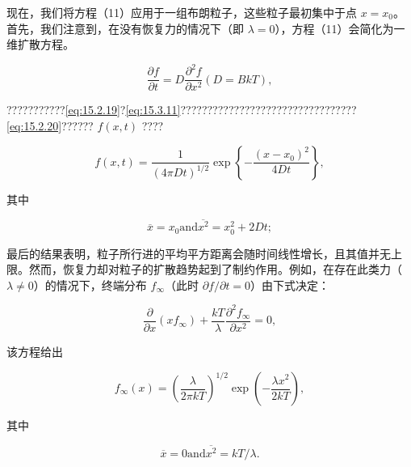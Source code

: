 现在，我们将方程（11）应用于一组布朗粒子，这些粒子最初集中于点 \(x = x_0\)。首先，我们注意到，在没有恢复力的情况下（即 \(\lambda = 0\)），方程（11）会简化为一维扩散方程。

\begin{equation}\tag{15.4.12}\label{eq:15.4.12}
\frac { \partial f } { \partial t } = D \frac { \partial ^{2} f } { \partial x ^{2} }  ( D = B k T ) ,
\end{equation}

???????????\autoref{eq:15.2.19}?\autoref{eq:15.3.11}?????????????????????????????????\autoref{eq:15.2.20}?????? \(f(x,t)\) ????

\begin{equation}\tag{15.4.13}\label{eq:15.4.13}
f ( x , t ) = \frac { 1 } { ( 4 \pi D t ) ^{1 / 2} } \exp \left\{ - \frac { ( x - x _ { 0 } ) ^{2} } { 4 D t } \right\} ,
\end{equation}

其中

\begin{equation}\tag{15.4.14}\label{eq:15.4.14}
{ \overline { { x } } } = x _ { 0 }  { \mathrm { a n d } }  { \overline { { x ^{2} } } } = x _ { 0 } ^{2} + 2 D t ;
\end{equation}

最后的结果表明，粒子所行进的平均平方距离会随时间线性增长，且其值并无上限。然而，恢复力却对粒子的扩散趋势起到了制约作用。例如，在存在此类力（\(\lambda \neq 0\)）的情况下，终端分布 \(f_{\infty}\)（此时 \(\partial f/\partial t = 0\)）由下式决定：

\begin{equation}\tag{15.4.15}\label{eq:15.4.15}
\frac { \partial } { \partial x } ( x f _ { \infty } ) + \frac { k T } { \lambda } \frac { \partial ^{2} f _ { \infty } } { \partial x ^{2} } = 0 ,
\end{equation}

该方程给出

\begin{equation}\tag{15.4.16}\label{eq:15.4.16}
f _ { \infty } ( x ) = \left( \frac { \lambda } { 2 \pi k T } \right) ^{1 / 2} \exp \left( - \frac { \lambda x ^{2} } { 2 k T } \right) ,
\end{equation}

其中

\begin{equation}\tag{15.4.17}\label{eq:15.4.17}
{ \overline { { x } } } = 0  { \mathrm { a n d } }  { \overline { { x ^{2} } } } = k T / \lambda .
\end{equation}

